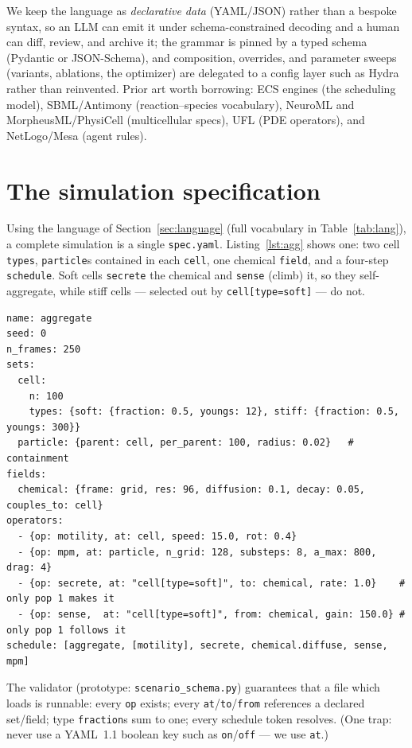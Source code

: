 \documentclass[11pt]{article}
\newcommand{\code}[1]{\texttt{#1}}
\begin{document}
We keep the language as \emph{declarative data} (YAML/JSON) rather than a bespoke
syntax, so an LLM can emit it under schema-constrained decoding and a human can
diff, review, and archive it; the grammar is pinned by a typed schema (Pydantic or
JSON-Schema), and composition, overrides, and parameter sweeps (variants, ablations,
the optimizer) are delegated to a config layer such as Hydra rather than reinvented.
Prior art worth borrowing: ECS engines (the scheduling model), SBML/Antimony
(reaction--species vocabulary), NeuroML and MorpheusML/PhysiCell (multicellular
specs), UFL (PDE operators), and NetLogo/Mesa (agent rules).

\section{The simulation specification}

Using the language of Section~\ref{sec:language} (full vocabulary in
Table~\ref{tab:lang}), a complete simulation is a single \code{spec.yaml}.
Listing~\ref{lst:agg} shows one: two cell \code{types}, \code{particle}s contained
in each \code{cell}, one chemical \code{field}, and a four-step \code{schedule}.
Soft cells \code{secrete} the chemical and \code{sense} (climb) it, so they
self-aggregate, while stiff cells --- selected out by \code{cell[type=soft]} ---
do not.

\begin{lstlisting}[style=yaml,caption={A complete simulation: soft cells secrete and follow a chemical and self-aggregate.},label=lst:agg]
name: aggregate
seed: 0
n_frames: 250
sets:
  cell:
    n: 100
    types: {soft: {fraction: 0.5, youngs: 12}, stiff: {fraction: 0.5, youngs: 300}}
  particle: {parent: cell, per_parent: 100, radius: 0.02}   # containment
fields:
  chemical: {frame: grid, res: 96, diffusion: 0.1, decay: 0.05, couples_to: cell}
operators:
  - {op: motility, at: cell, speed: 15.0, rot: 0.4}
  - {op: mpm, at: particle, n_grid: 128, substeps: 8, a_max: 800, drag: 4}
  - {op: secrete, at: "cell[type=soft]", to: chemical, rate: 1.0}    # only pop 1 makes it
  - {op: sense,  at: "cell[type=soft]", from: chemical, gain: 150.0} # only pop 1 follows it
schedule: [aggregate, [motility], secrete, chemical.diffuse, sense, mpm]
\end{lstlisting}

The validator (prototype: \code{scenario\_schema.py}) guarantees that a file which
loads is runnable: every \code{op} exists; every \code{at}/\code{to}/\code{from}
references a declared set/field; type \code{fraction}s sum to one; every schedule
token resolves. (One trap: never use a YAML~1.1 boolean key such as
\code{on}/\code{off} --- we use \code{at}.)
\end{document}
